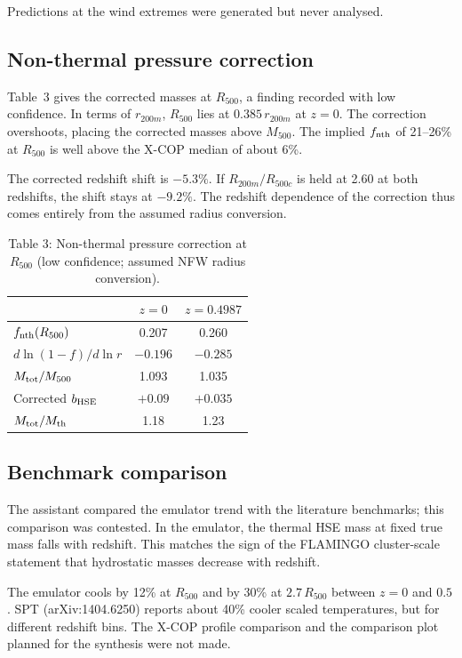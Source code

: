 \documentclass[11pt,a4paper]{article}
\begin{document}
Predictions at the wind extremes were generated but never analysed.

\subsection{Non-thermal pressure correction}
Table~3 gives the corrected masses at $R_{500}$, a finding recorded with low confidence. In terms of $r_{200m}$, $R_{500}$ lies at $0.385\,r_{200m}$ at $z=0$. The correction overshoots, placing the corrected masses above $M_{500}$. The implied $f_{\rm nth}$ of 21--26\% at $R_{500}$ is well above the X-COP median of about 6\%.

The corrected redshift shift is $-5.3\%$. If $R_{200m}/R_{500c}$ is held at 2.60 at both redshifts, the shift stays at $-9.2\%$. The redshift dependence of the correction thus comes entirely from the assumed radius conversion.

\begin{table}
\centering
\begin{tabular}{lcc}
\toprule
 & $z=0$ & $z=0.4987$ \\
\midrule
$f_{\rm nth}(R_{500})$ & 0.207 & 0.260 \\
$d\ln(1-f)/d\ln r$ & $-0.196$ & $-0.285$ \\
$M_{\rm tot}/M_{500}$ & 1.093 & 1.035 \\
Corrected $b_{\rm HSE}$ & $+0.09$ & $+0.035$ \\
$M_{\rm tot}/M_{\rm th}$ & 1.18 & 1.23 \\
\bottomrule
\end{tabular}
\caption*{Table 3: Non-thermal pressure correction at $R_{500}$ (low confidence; assumed NFW radius conversion).}
\end{table}

\subsection{Benchmark comparison}
The assistant compared the emulator trend with the literature benchmarks; this comparison was contested. In the emulator, the thermal HSE mass at fixed true mass falls with redshift. This matches the sign of the FLAMINGO cluster-scale statement that hydrostatic masses decrease with redshift.

The emulator cools by 12\% at $R_{500}$ and by 30\% at $2.7\,R_{500}$ between $z=0$ and $0.5$. SPT (arXiv:1404.6250) reports about 40\% cooler scaled temperatures, but for different redshift bins. The X-COP profile comparison and the comparison plot planned for the synthesis were not made.
\end{document}
